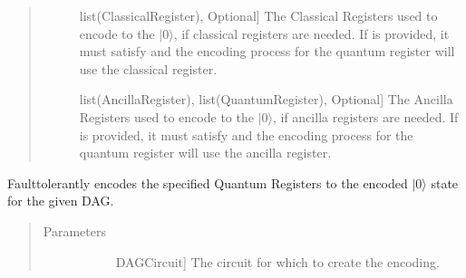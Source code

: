 \documentclass[letterpaper,10pt,english]{sphinxmanual}
\begin{document}
\begin{fulllineitems}
\begin{fulllineitems}
\begin{quote}
\begin{description}
\begin{description}
\item[{}] \leavevmode{[}list(ClassicalRegister), Optional{]}
\sphinxAtStartPar
The Classical Registers used to encode to the \(|0\rangle\), if classical registers are needed. If  is provided, it must satisfy  and the encoding process for the  quantum register will use the  classical register.

\item[{}] \leavevmode{[}list(AncillaRegister), list(QuantumRegister), Optional{]}
\sphinxAtStartPar
The Ancilla Registers used to encode to the \(|0\rangle\), if ancilla registers are needed. If  is provided, it must satisfy  and the encoding process for the  quantum register will use the  ancilla register.

\end{description}

\end{description}\end{quote}

\end{fulllineitems}


\begin{fulllineitems}
\label{\detokenize{Base:BaseFaultTolerance.FaultTolerantEncoder.getEncoderDag}}
\sphinxAtStartPar
Fault\sphinxhyphen{}tolerantly encodes the specified Quantum Registers to the encoded \(|0\rangle\) state for the given DAG.
\begin{quote}\begin{description}
\item[{Parameters}] \leavevmode\begin{description}
\item[{}] \leavevmode{[}DAGCircuit{]}
\sphinxAtStartPar
The circuit for which to create the encoding.


\end{description}
\end{description}
\end{quote}
\end{fulllineitems}
\end{fulllineitems}
\end{document}
